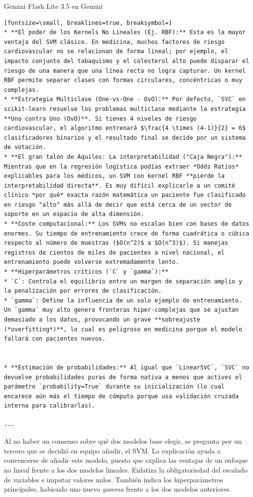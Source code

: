 \documentclass[12pt,a4paper,oneside]{book}
\begin{document}
\begin{iaresp}{Gemini Flash Lite 3.5 en Gemini}
\begin{Verbatim}[fontsize=\small, breaklines=true, breaksymbol=]
* **El poder de los Kernels No Lineales (Ej. RBF):** Esta es la mayor ventaja del SVM clásico. En medicina, muchos factores de riesgo cardiovascular no se relacionan de forma lineal; por ejemplo, el impacto conjunto del tabaquismo y el colesterol alto puede disparar el riesgo de una manera que una línea recta no logra capturar. Un kernel RBF permite separar clases con formas circulares, concéntricas o muy complejas.
* **Estrategia Multiclase (One-vs-One - OvO):** Por defecto, `SVC` en scikit-learn resuelve los problemas multiclase mediante la estrategia **Uno contra Uno (OvO)**. Si tienes 4 niveles de riesgo cardiovascular, el algoritmo entrenará $\frac{4 \times (4-1)}{2} = 6$ clasificadores binarios y el resultado final se decide por un sistema de votación.
* **El gran talón de Aquiles: La interpretabilidad ("Caja Negra"):** Mientras que en la regresión logística podías extraer *Odds Ratios* explicables para los médicos, un SVM con kernel RBF **pierde la interpretabilidad directa**. Es muy difícil explicarle a un comité clínico *por qué* exacta razón matemática un paciente fue clasificado en riesgo "alto" más allá de decir que está cerca de un vector de soporte en un espacio de alta dimensión.
* **Coste computacional:** Los SVMs no escalan bien con bases de datos enormes. Su tiempo de entrenamiento crece de forma cuadrática o cúbica respecto al número de muestras ($O(n^2)$ a $O(n^3)$). Si manejas registros de cientos de miles de pacientes a nivel nacional, el entrenamiento puede volverse extremadamente lento.
* **Hiperparámetros críticos (`C` y `gamma`):**
* `C`: Controla el equilibrio entre un margen de separación amplio y la penalización por errores de clasificación.
* `gamma`: Define la influencia de un solo ejemplo de entrenamiento. Un `gamma` muy alto genera fronteras hiper-complejas que se ajustan demasiado a los datos, provocando un grave **sobreajuste (*overfitting*)**, lo cual es peligroso en medicina porque el modelo fallará con pacientes nuevos.


* **Estimación de probabilidades:** Al igual que `LinearSVC`, `SVC` no devuelve probabilidades puras de forma nativa a menos que actives el parámetro `probability=True` durante su inicialización (lo cual encarece aún más el tiempo de cómputo porque usa validación cruzada interna para calibrarlas).

---
\end{Verbatim}
\end{iaresp}
\begin{iaanalisis}
Al no haber un consenso sobre qué dos modelos base elegir, se pregunta por un tercero que se decidió en equipo añadir, el SVM. La explicación ayuda a convencerse de añadir este modelo, puesto que explica las ventajas de un enfoque no lineal frente a los dos modelos lineales. Enfatiza la obligatoriedad del escalado de variables e imputar valores nulos. También indica los hiperparámetros principales, habiendo uno nuevo \textit{gamma} frente a los dos modelos anteriores.
\end{iaanalisis}
\end{document}
